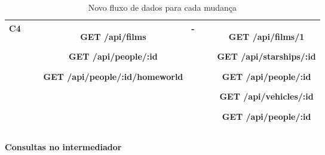 \begin{table}[H]
\begin{tabular}{|c|c|c|c|}
    \hline
    C4 & \begin{minipage}[t]{0.3\textwidth}
      \begin{itemize}
        \item[\textbf{GET}] /api/films
        \item[\textbf{GET}] /api/people/:id
        \item[\textbf{GET}] /api/people/:id/homeworld
      \end{itemize}
    \end{minipage} & - & \begin{minipage}[t]{0.3\textwidth}
      \begin{itemize}
        \item[\textbf{GET}] /api/films/1
        \item[\textbf{GET}] /api/starships/:id
        \item[\textbf{GET}] /api/people/:id
        \item[\textbf{GET}] /api/vehicles/:id
        \item[\textbf{GET}] /api/people/:id
      \end{itemize}
    \end{minipage} \\
    \hline
  \end{tabular}
  \caption{Novo fluxo de dados para cada mudança}
\end{table}

\textbf{Consultas no intermediador} \\

